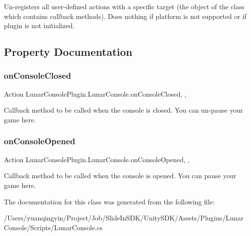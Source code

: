 Un-\/registers all user-\/defined actions with a specific target (the object of the class which contains callback methods). Does nothing if platform is not supported or if plugin is not initialized. 



\subsection{Property Documentation}
\mbox{\label{class_lunar_console_plugin_1_1_lunar_console_a3ba133206c6a1f45bb1ee19429bcd313}} 
\subsubsection{\texorpdfstring{on\+Console\+Closed}{onConsoleClosed}}
{\footnotesize\ttfamily Action Lunar\+Console\+Plugin.\+Lunar\+Console.\+on\+Console\+Closed\hspace{0.3cm}{\ttfamily [static]}, {\ttfamily [get]}, {\ttfamily [set]}}



Callback method to be called when the console is closed. You can un-\/pause your game here. 

\mbox{\label{class_lunar_console_plugin_1_1_lunar_console_ad80d6876172ef84b7a2d4a7439c8ebeb}} 
\subsubsection{\texorpdfstring{on\+Console\+Opened}{onConsoleOpened}}
{\footnotesize\ttfamily Action Lunar\+Console\+Plugin.\+Lunar\+Console.\+on\+Console\+Opened\hspace{0.3cm}{\ttfamily [static]}, {\ttfamily [get]}, {\ttfamily [set]}}



Callback method to be called when the console is opened. You can pause your game here. 



The documentation for this class was generated from the following file\+:\begin{DoxyCompactItemize}
\item 
/\+Users/yuanqingyin/\+Project/\+Job/\+Slide\+In\+S\+D\+K/\+Unity\+S\+D\+K/\+Assets/\+Plugins/\+Lunar\+Console/\+Scripts/Lunar\+Console.\+cs\end{DoxyCompactItemize}

